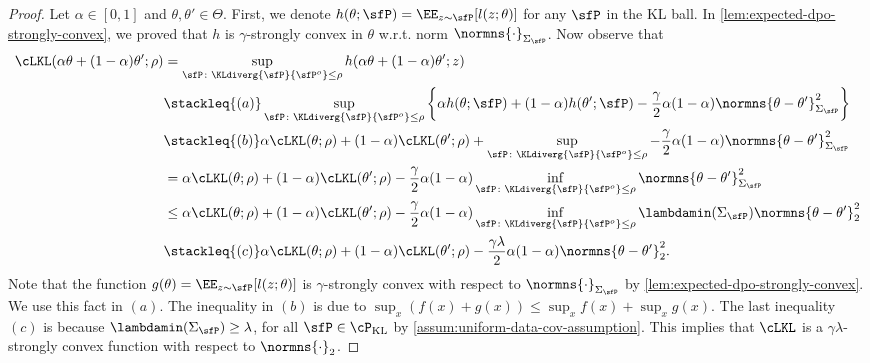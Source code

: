 \begin{proof}
    Let $\alpha\in[0,1]$ and $\theta,\theta'\in\Theta$. First, we denote $h(\theta;\sfP)=\EE_{z\sim\sfP}[l(z;\theta)]$ for any $\sfP$ in the KL ball. In \cref{lem:expected-dpo-strongly-convex}, we proved that $h$ is $\gamma$-strongly convex in $\theta$ w.r.t. norm $\normns{\cdot}_{\Sigma_{\sfP}}$. Now observe that
    \begin{align*}
        \cLKL(\alpha\theta+(1-\alpha)\theta';\rho) &= \sup_{\sfP\colon\KLdiverg{\sfP}{\sfP^o}\leq\rho} h(\alpha\theta+(1-\alpha)\theta';z)\\
        &\stackleq{(a)} \sup_{\sfP\colon\KLdiverg{\sfP}{\sfP^o}\leq\rho} \bigg\{  \alpha h(\theta;\sfP) + (1-\alpha)h(\theta';\sfP) -\frac{\gamma}{2}\alpha(1-\alpha)\normns{\theta-\theta'}^2_{\Sigma_\sfP} \bigg\} \\
        &\stackleq{(b)} \alpha\cLKL(\theta;\rho) + (1-\alpha)\cLKL(\theta';\rho) + \sup_{\sfP\colon\KLdiverg{\sfP}{\sfP^o}\leq\rho}-\frac{\gamma}{2}\alpha(1-\alpha)\normns{\theta-\theta'}^2_{\Sigma_{\sfP}}\\
        &= \alpha\cLKL(\theta;\rho) + (1-\alpha)\cLKL(\theta';\rho) - \frac{\gamma}{2}\alpha(1-\alpha)\inf_{\sfP\colon\KLdiverg{\sfP}{\sfP^o}\leq\rho}\normns{\theta-\theta'}^2_{\Sigma_{\sfP}} \\
        &\leq \alpha\cLKL(\theta;\rho) + (1-\alpha)\cLKL(\theta';\rho) - \frac{\gamma}{2}\alpha(1-\alpha)\inf_{\sfP\colon\KLdiverg{\sfP}{\sfP^o}\leq\rho}\lambdamin(\Sigma_{\sfP})\normns{\theta-\theta'}^2_2 \\
        &\stackleq{(c)} \alpha\cLKL(\theta;\rho) + (1-\alpha)\cLKL(\theta';\rho)- \frac{\gamma\lambda}{2}\alpha(1-\alpha)\normns{\theta-\theta'}^2_2.
    \end{align*}
    Note that the function $g(\theta)=\EE_{z\sim\sfP}[l(z;\theta)]$ is $\gamma$-strongly convex with respect to $\normns{\cdot}_{\Sigma_\sfP}$ by \cref{lem:expected-dpo-strongly-convex}. We use this fact in $(a)$. The inequality in $(b)$ is due to $\sup_x (f(x)+g(x))\leq \sup_x f(x) + \sup_x g(x)$. The last inequality $(c)$ is because $\lambdamin(\Sigma_{\sfP}) \geq \lambda$, for all $\sfP\in\cP_{\mathrm{KL}}$ by \cref{assum:uniform-data-cov-assumption}. This implies that $\cLKL$ is a $\gamma\lambda$-strongly convex function with respect to $\normns{\cdot}_2$.
\end{proof}

